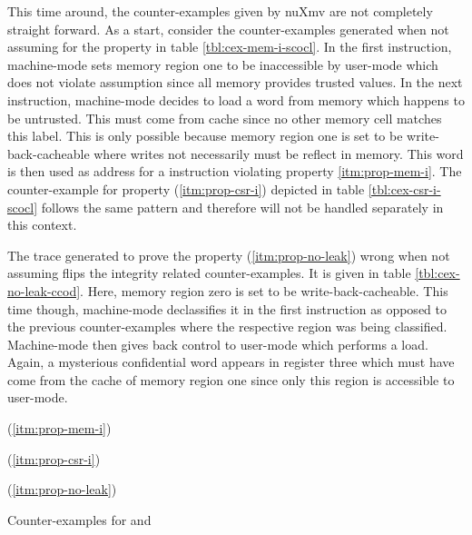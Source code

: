 This time around, the counter-examples given by nuXmv are not completely straight forward.
As a start, consider the counter-examples generated when not assuming  for the  property in table \ref{tbl:cex-mem-i-scocl}.
In the first instruction, machine-mode sets memory region one to be inaccessible by user-mode which does not violate assumption  since all memory provides trusted values.
In the next instruction, machine-mode decides to load a word from memory which happens to be untrusted.
This must come from cache since no other memory cell matches this label.
This is only possible because memory region one is set to be write-back-cacheable where writes not necessarily must be reflect in memory.
This word is then used as address for a  instruction violating property \ref{itm:prop-mem-i}.
The counter-example for property  (\ref{itm:prop-csr-i}) depicted in table \ref{tbl:cex-csr-i-scocl} follows the same pattern and therefore will not be handled separately in this context.

The trace generated to prove the  property (\ref{itm:prop-no-leak}) wrong when not assuming  flips the integrity related counter-examples.
It is given in table \ref{tbl:cex-no-leak-ccod}.
Here, memory region zero is set to be write-back-cacheable.
This time though, machine-mode declassifies it in the first instruction as opposed to the previous counter-examples where the respective region was being classified.
Machine-mode then gives back control to user-mode which performs a load.
Again, a mysterious confidential word appears in register three which must have come from the cache of memory region one since only this region is accessible to user-mode.

\begin{table}
    \begin{subtable}{\textwidth}
        \centering
        
        \caption{ (\ref{itm:prop-mem-i})}
        \label{tbl:cex-mem-i-scocl}
    \end{subtable}

    \begin{subtable}{\textwidth}
        \centering
        
        \caption{ (\ref{itm:prop-csr-i})}
        \label{tbl:cex-csr-i-scocl}
    \end{subtable}

    \begin{subtable}{\textwidth}
        \centering
        
        \caption{ (\ref{itm:prop-no-leak})}
        \label{tbl:cex-no-leak-ccod}
    \end{subtable}
    \caption{Counter-examples for  and }
\end{table}

